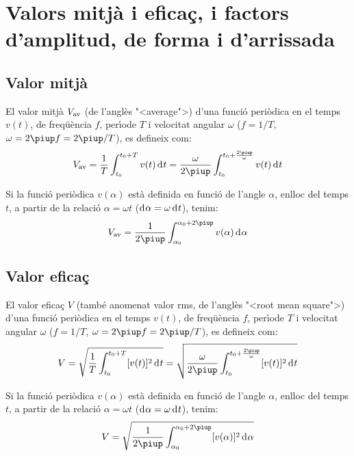\section{Valors mitj\`{a} i efica\c{c}, i factors d'amplitud, de forma i
d'arrissada}\label{sec:val_mitja_ef}

\subsection{Valor mitj\`{a}}

El valor mitj\`{a} $V_\mathrm{av}$ (de l'angl\`{e}s {"<}average{">}) d'una funci\'{o}
peri\`{o}dica en el temps $v(t)$, de freq\"{u}\`{e}ncia $f$, per\'{\i}ode $T$ i
velocitat angular $\omega$ ($f = 1/T$, $\omega=2\piup f = 2\piup/T$), es
defineix com:
\begin{equation}
    V\ped{av} = \frac{1}{T} \int_{t_0}^{t_0+T} v(t) \diff t =
    \frac{\omega}{2\piup} \int_{t_0}^{t_0+\frac{2\piup}{\omega}} v(t) \diff t\label{eq:vm_t}
\end{equation}

Si la funci\'{o} peri\`{o}dica $v(\alpha)$ est\`{a} definida en funci\'{o} de
l'angle $\alpha$, enlloc del temps $t$, a partir de la relaci\'{o}
$\alpha=\omega t$ ($\diff\alpha=\omega\diff t$), tenim:
\begin{equation}
    V\ped{av} = \frac{1}{2\piup} \int_{\alpha_0}^{\alpha_0+2\piup} v(\alpha) \diff \alpha
    \label{eq:vm_alfa}
\end{equation}

\subsection{Valor efica\c{c}}

El valor efica\c{c}  $V$ (tamb\'{e} anomenat valor rms, de l'angl\`{e}s {"<}root
mean square{">}) d'una funci\'{o} peri\`{o}dica en el temps $v(t)$, de
freq\"{u}\`{e}ncia $f$, per\'{\i}ode $T$ i velocitat angular $\omega$ ($f = 1/T$,
$\omega=2\piup f = 2\piup/T$), es defineix com:
\begin{equation}
    V = \sqrt{\frac{1}{T} \int_{t_0}^{t_0+T} [v(t)]^2 \diff
    t} = \sqrt{\frac{\omega}{2\piup} \int_{t_0}^{t_0+\frac{2\piup}{\omega}}
     [v(t)]^2 \diff t}
\end{equation}

Si la funci\'{o} peri\`{o}dica $v(\alpha)$ est\`{a} definida en funci\'{o} de
l'angle $\alpha$, enlloc del temps $t$, a partir de la relaci\'{o}
$\alpha=\omega t$ ($\diff\alpha=\omega\diff t$), tenim:
\begin{equation}
    V = \sqrt{\frac{1}{2\piup} \int_{\alpha_0}^{\alpha_0+2\piup}
     [v(\alpha)]^2 \diff \alpha}
\end{equation}

